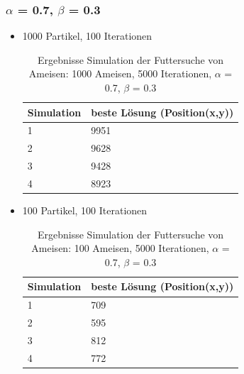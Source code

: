 \documentclass[a4paper, 11pt]{article}
\begin{document}
\subsubsection{$\alpha$ = 0.7, $\beta$ = 0.3}
\begin{itemize}
	\item 1000 Partikel, 100 Iterationen
	\begin{table}[h]
		\begin{tabular}{p{2.5cm}|p{11cm}}
			Simulation & beste Lösung (Position(x,y))\\ \hline\hline
			1 & 9951\\ \hline
			2 & 9628\\ \hline
			3 & 9428\\ \hline
			4 & 8923\\ \hline
		\end{tabular}
		\caption{Ergebnisse Simulation der Futtersuche von Ameisen: 1000 Ameisen, 5000 Iterationen, $\alpha$ = 0.7, $\beta$ = 0.3}
		\label{tabframework}
	\end{table}
	\item 100 Partikel, 100 Iterationen
	\begin{table}[h]
		\begin{tabular}{p{2.5cm}|p{11cm}}
			Simulation & beste Lösung (Position(x,y))\\ \hline\hline
			1 & 709\\ \hline
			2 & 595\\ \hline
			3 & 812\\ \hline
			4 & 772\\ \hline
		\end{tabular}
		\caption{Ergebnisse Simulation der Futtersuche von Ameisen: 100 Ameisen, 5000 Iterationen, $\alpha$ = 0.7, $\beta$ = 0.3}
		\label{tabframework}
	\end{table}
\end{itemize}
\newpage
\end{document}
